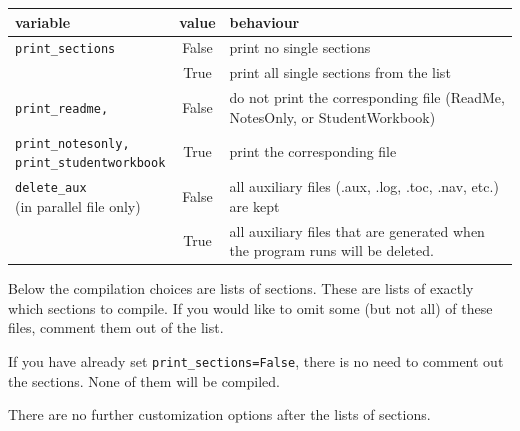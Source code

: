 \documentclass[10pt]{beamer}
\begin{document}
\begin{frame}

\begin{tabular}{lc l}
\textbf{variable} &\textbf{ value} & \textbf{behaviour}\\\hline
\texttt{print\_sections} & False & print no single sections\\
 & True & print all single sections from the list\\
 \hline
\texttt{print\_readme,} 
&False & \parbox[t]{0.55\textwidth}{\raggedright do not print the corresponding file (ReadMe, NotesOnly, or  StudentWorkbook)}\\
\parbox[t]{0.2\textwidth}{\texttt{print\_notesonly,\\print\_studentworkbook}}
&True & print the corresponding file
\\\hline
\parbox[t]{0.2\textwidth}{\texttt{delete\_aux} \\ (in parallel file only)}& False &  \parbox[t]{0.55\textwidth}{all auxiliary files (.aux, .log, .toc, .nav, etc.) are kept}\\
 & True & \parbox[t]{0.55\textwidth}{\raggedright all auxiliary files that are generated when the program runs will be deleted. }
 \\ \hline
\end{tabular}
\end{frame}

\begin{frame}
Below the compilation choices are lists of sections. These are lists of exactly which sections to compile. If you would like to omit some (but not all) of these files, comment them out of the list.\vfill

If you have already set \texttt{print\_sections=False}, there is no need to comment out the sections. None of them will be compiled.
\vfill

There are no further customization options after the lists of sections.
\end{frame}


\end{document}

